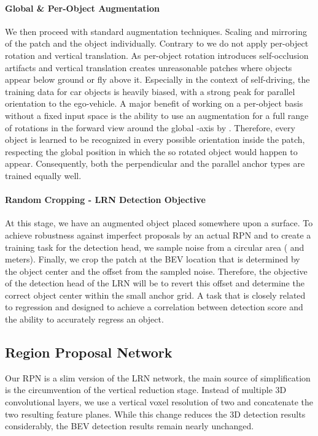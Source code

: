 \documentclass{article}
\begin{document}
\paragraph{Global \& Per-Object Augmentation}
We then proceed with standard augmentation techniques. Scaling and mirroring of the patch and the object individually.
Contrary to \cite{Zhou2018voxel,Yan2018second} we do not apply per-object rotation and vertical translation. As per-object rotation introduces self-occlusion artifacts and vertical translation creates unreasonable patches where objects appear below ground or fly above it. 
Especially in the context of self-driving, the training data for car objects is heavily biased, with a strong peak for parallel orientation to the ego-vehicle. A major benefit of working on a per-object basis without a fixed input space is the ability to use an augmentation for a full range of rotations in the forward view around the global -axis by . 
Therefore, every object is learned to be recognized in every possible orientation inside the patch, respecting the global position in which the so rotated object would happen to appear. Consequently, both the perpendicular and the parallel anchor types are trained equally well.

\paragraph{Random Cropping - LRN Detection Objective}
At this stage, we have an augmented object placed somewhere upon a surface. To achieve robustness against imperfect proposals by an actual RPN and to create a training task for the detection head, we sample noise from a circular area ( and  meters). Finally, we crop the patch at the BEV location that is determined by the object center and the offset from the sampled noise. Therefore, the objective of the detection head of the LRN will be to revert this offset and determine the correct object center within the small anchor grid. A task that is closely related to regression and designed to achieve a correlation between detection score and the ability to accurately regress an object.

\subsection{Region Proposal Network}
Our RPN is a slim version of the LRN network, the main source of simplification is the circumvention of the vertical reduction stage. Instead of multiple 3D convolutional layers, we use a vertical voxel resolution of two and concatenate the two resulting feature planes.
While this change reduces the 3D detection results considerably, the BEV detection results remain nearly unchanged. 
\end{document}
